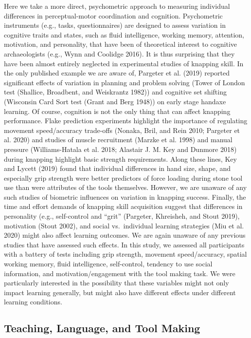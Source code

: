 \documentclass[smallextended]{svjour3}       %
\begin{document}
Here we take a more direct, psychometric approach to measuring
individual differences in perceptual-motor coordination and cognition.
Psychometric instruments (e.g., tasks, questionnaires) are designed to
assess variation in cognitive traits and states, such as fluid
intelligence, working memory, attention, motivation, and personality,
that have been of theoretical interest to cognitive archaeologists
(e.g., Wynn and Coolidge 2016). It is thus surprising that they have
been almost entirely neglected in experimental studies of knapping
skill. In the only published example we are aware of, Pargeter et al.
(2019) reported significant effects of variation in planning and problem
solving (Tower of London test (Shallice, Broadbent, and Weiskrantz
1982)) and cognitive set shifting (Wisconsin Card Sort test (Grant and
Berg 1948)) on early stage handaxe learning. Of course, cognition is not
the only thing that can affect knapping performance. Flake prediction
experiments highlight the importance of regulating movement
speed/accuracy trade-offs (Nonaka, Bril, and Rein 2010; Pargeter et al.
2020) and studies of muscle recruitment (Marzke et al. 1998) and manual
pressure (Williams-Hatala et al. 2018; Alastair J. M. Key and Dunmore
2018) during knapping highlight basic strength requirements. Along these
lines, Key and Lycett (2019) found that individual differences in hand
size, shape, and especially grip strength were better predictors of
force loading during stone tool use than were attributes of the tools
themselves. However, we are unaware of any such studies of biometric
influences on variation in knapping success. Finally, the time and
effort demands of knapping skill acquisition suggest that differences in
personality (e.g., self-control and ``grit'' (Pargeter, Khreisheh, and
Stout 2019), motivation (Stout 2002), and social vs.~individual learning
strategies (Miu et al. 2020) might also affect learning outcomes. We are
again unaware of any previous studies that have assessed such effects.
In this study, we assessed all participants with a battery of tests
including grip strength, movement speed/accuracy, spatial working
memory, fluid intelligence, self-control, tendency to use social
information, and motivation/engagement with the tool making task. We
were particularly interested in the possibility that these variables
might not only impact learning generally, but might also have different
effects under different learning conditions.~

\hypertarget{teaching-language-and-tool-making}{%
\subsection{\texorpdfstring{\textbf{Teaching, Language, and Tool
Making}}{Teaching, Language, and Tool Making}}\label{teaching-language-and-tool-making}}
\end{document}
